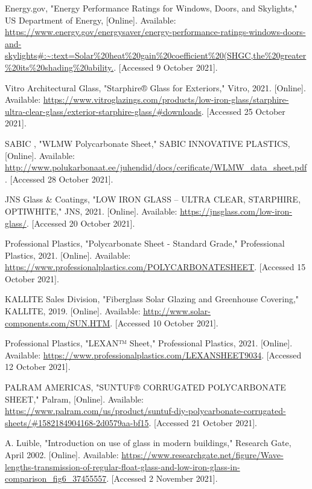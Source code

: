 \documentclass{ucalgarythesis}
\begin{document}
\begin{thebibliography}{9}
     Energy.gov, "Energy Performance Ratings for Windows, Doors, and Skylights," US Department of Energy, [Online]. Available: \url{https://www.energy.gov/energysaver/energy-performance-ratings-windows-doors-and-skylights#:~:text=Solar\%20heat\%20gain\%20coefficient\%20(SHGC,the\%20greater\%20its\%20shading\%20ability.}. [Accessed 9 October 2021].
    
     Vitro Architectural Glass, "Starphire® Glass for Exteriors," Vitro, 2021. [Online]. Available: \url{https://www.vitroglazings.com/products/low-iron-glass/starphire-ultra-clear-glass/exterior-starphire-glass/#downloads}. [Accessed 25 October 2021].
    
     SABIC , "WLMW Polycarbonate Sheet," SABIC INNOVATIVE PLASTICS, [Online]. Available: \url{http://www.polukarbonaat.ee/juhendid/docs/cerificate/WLMW_data_sheet.pdf}. [Accessed 28 October 2021].
    
     JNS Glass \& Coatings, "LOW IRON GLASS – ULTRA CLEAR, STARPHIRE, OPTIWHITE," JNS, 2021. [Online]. Available: \url{https://jnsglass.com/low-iron-glass/}. [Accessed 20 October 2021].
    
     Professional Plastics, "Polycarbonate Sheet - Standard Grade," Professional Plastics, 2021. [Online]. Available: \url{https://www.professionalplastics.com/POLYCARBONATESHEET}. [Accessed 15 October 2021].
    
     KALLITE Sales Division, "Fiberglass Solar Glazing and Greenhouse Covering," KALLITE, 2019. [Online]. Available: \url{http://www.solar-components.com/SUN.HTM}. [Accessed 10 October 2021].
    
     Professional Plastics, "LEXAN™ Sheet," Professional Plastics, 2021. [Online]. Available: \url{https://www.professionalplastics.com/LEXANSHEET9034}. [Accessed 12 October 2021].
    
     PALRAM AMERICAS, "SUNTUF® CORRUGATED POLYCARBONATE SHEET," Palram, [Online]. Available: \url{https://www.palram.com/us/product/suntuf-diy-polycarbonate-corrugated-sheets/#1582184904168-2d0579aa-bf15}. [Accessed 21 October 2021].
    
     A. Luible, "Introduction on use of glass in modern buildings," Research Gate, April 2002. [Online]. Available: \url{https://www.researchgate.net/figure/Wave-lengths-transmission-of-regular-float-glass-and-low-iron-glass-in-comparison_fig6_37455557}. [Accessed 2 November 2021].
    

\end{thebibliography}
\end{document}
